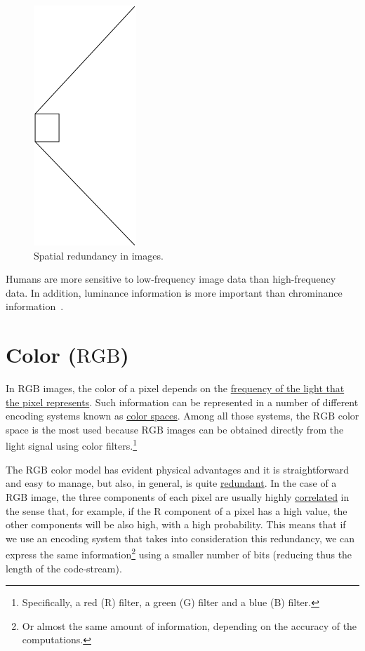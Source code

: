 \begin{figure}
  \includegraphics{graphics/correlacion_lena}
  \caption{Spatial redundancy in images.}
  \label{fig:correlacion_lena}
\end{figure}

Humans are more sensitive to low-frequency image data than
high-frequency data. In addition, luminance information is more
important than chrominance information~\cite{kondoz2009visual}.

\section{Color ($\text{RGB}$)}
In $\text{RGB}$ images, the color of a pixel depends on the
\href{https://en.wikipedia.org/wiki/Visible_spectrum}{frequency of the
  light that the pixel represents}. Such information can be
represented in a number of different encoding systems known as
\href{https://en.wikipedia.org/wiki/Color_space}{color spaces}. Among
all those systems, the $\text{RGB}$ color space is the most used
because $\text{RGB}$ images can be obtained directly from the light
signal using color filters.\footnote{Specifically, a red (R) filter, a
green (G) filter and a blue (B) filter.}

The $\text{RGB}$ color model has evident physical advantages and it is
straightforward and easy to manage, but also, in general, is quite
\href{https://en.wikipedia.org/wiki/Data_redundancy}{redundant}. In
the case of a $\text{RGB}$ image, the three components of each pixel
are usually highly
\href{https://en.wikipedia.org/wiki/Correlation_and_dependence}{correlated}
in the sense that, for example, if the $\text{R}$ component of a pixel
has a high value, the other components will be also high, with a high
probability. This means that if we use an encoding system that takes
into consideration this redundancy, we can express the same
information\footnote{Or almost the same amount of information,
depending on the accuracy of the computations.} using a smaller number
of bits (reducing thus the length of the code-stream).

